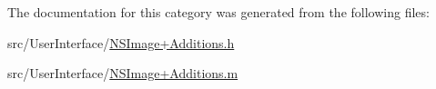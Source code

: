 The documentation for this category was generated from the following files\-:\begin{DoxyCompactItemize}
\item 
src/\-User\-Interface/\hyperlink{_n_s_image_09_additions_8h}{N\-S\-Image+\-Additions.\-h}\item 
src/\-User\-Interface/\hyperlink{_n_s_image_09_additions_8m}{N\-S\-Image+\-Additions.\-m}\end{DoxyCompactItemize}
